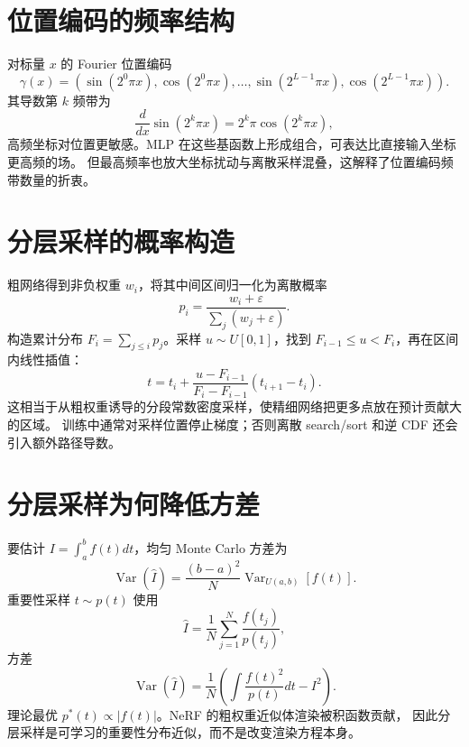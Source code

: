 \documentclass[11pt]{article}
\numberwithin{equation}{section}
\newcommand{\1}{\mathbf{1}}
\newcommand{\Var}{\operatorname{Var}}
\begin{document}
\section{位置编码的频率结构}

对标量 $x$ 的 Fourier 位置编码
\begin{equation}
 \gamma(x)=(\sin(2^0\pi x),\cos(2^0\pi x),\ldots,
 \sin(2^{L-1}\pi x),\cos(2^{L-1}\pi x)).
\end{equation}
其导数第 $k$ 频带为
\begin{equation}
 \frac d{dx}\sin(2^k\pi x)=2^k\pi\cos(2^k\pi x),
\end{equation}
高频坐标对位置更敏感。MLP 在这些基函数上形成组合，可表达比直接输入坐标更高频的场。
但最高频率也放大坐标扰动与离散采样混叠，这解释了位置编码频带数量的折衷。

\section{分层采样的概率构造}

粗网络得到非负权重 $w_i$，将其中间区间归一化为离散概率
\begin{equation}
 p_i=\frac{w_i+\varepsilon}{\sum_j(w_j+\varepsilon)}.
\end{equation}
构造累计分布 $F_i=\sum_{j\le i}p_j$。采样 $u\sim U[0,1]$，找到
$F_{i-1}\le u<F_i$，再在区间内线性插值：
\begin{equation}
 t=t_i+\frac{u-F_{i-1}}{F_i-F_{i-1}}(t_{i+1}-t_i).
\end{equation}
这相当于从粗权重诱导的分段常数密度采样，使精细网络把更多点放在预计贡献大的区域。
训练中通常对采样位置停止梯度；否则离散 search/sort 和逆 CDF 还会引入额外路径导数。

\section{分层采样为何降低方差}

要估计 $I=\int_a^bf(t)dt$，均匀 Monte Carlo 方差为
\begin{equation}
 \Var(\widehat I)=\frac{(b-a)^2}{N}\Var_{U(a,b)}[f(t)].
\end{equation}
重要性采样 $t\sim p(t)$ 使用
\begin{equation}
 \widehat I=\frac1N\sum_{j=1}^{N}\frac{f(t_j)}{p(t_j)},
\end{equation}
方差
\begin{equation}
 \Var(\widehat I)=\frac1N
 \left(\int\frac{f(t)^2}{p(t)}dt-I^2\right).
\end{equation}
理论最优 $p^*(t)\propto|f(t)|$。NeRF 的粗权重近似体渲染被积函数贡献，
因此分层采样是可学习的重要性分布近似，而不是改变渲染方程本身。
\end{document}

